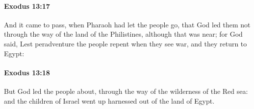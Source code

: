 		\paragraph{Exodus 13:17} %
			\label{EXODUS-13-17}

			And it came to pass, when Pharaoh had let the people go, that God led them not through the way of the land of the Philistines, although that was near; for God said, Lest peradventure the people repent when they see war, and they return to Egypt:


		\paragraph{Exodus 13:18} %
			\label{EXODUS-13-18}

			But God led the people about, through the way of the wilderness of the Red sea: and the children of Israel went up harnessed out of the land of Egypt.

